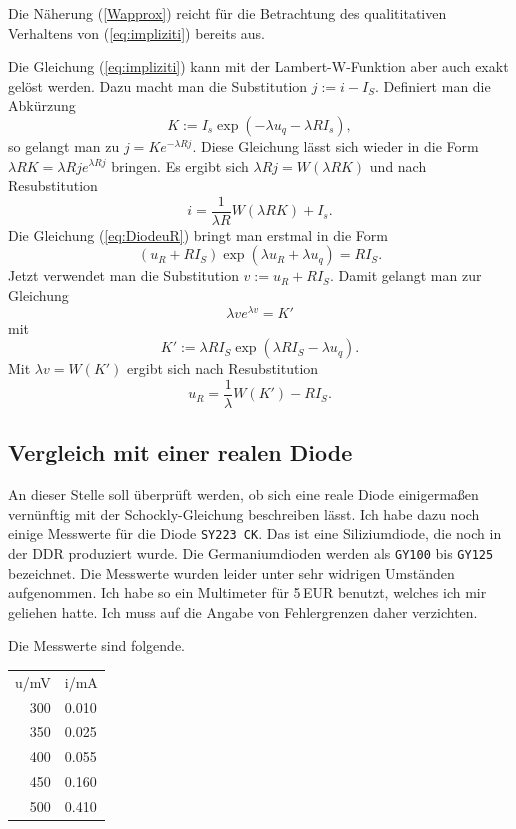 \documentclass[a4paper,10pt,fleqn,twocolumn,twoside]{article}
\numberwithin{equation}{section}
\begin{document}
Die Näherung (\ref{Wapprox}) reicht für die Betrachtung des
qualititativen Verhaltens von (\ref{eq:impliziti}) bereits aus.

Die Gleichung (\ref{eq:impliziti}) kann mit der Lambert-W-Funktion
aber auch exakt gelöst werden. Dazu macht man die Substitution
$j:=i-I_S$. Definiert man die Abkürzung
\begin{equation}
K:=I_s\exp(-\lambda u_q-\lambda RI_s),
\end{equation}
so gelangt man zu $j=Ke^{-\lambda Rj}$. Diese Gleichung lässt sich
wieder in die Form $\lambda RK=\lambda Rje^{\lambda Rj}$
bringen. Es ergibt sich $\lambda Rj=W(\lambda RK)$ und
nach Resubstitution
\begin{equation}
i = \frac{1}{\lambda R}W(\lambda RK)+I_s.
\end{equation}
Die Gleichung (\ref{eq:DiodeuR}) bringt man erstmal in die
Form
\begin{equation}
(u_R+RI_S)\exp(\lambda u_R+\lambda u_q) = RI_S.
\end{equation}
Jetzt verwendet man die Substitution
$v:=u_R+RI_S$. Damit gelangt man zur Gleichung
\begin{equation}
\lambda ve^{\lambda v}=K'
\end{equation}
mit
\begin{equation}
K':=\lambda RI_S\exp(\lambda RI_S-\lambda u_q).
\end{equation}
Mit $\lambda v=W(K')$ ergibt sich nach Resubstitution
\begin{equation}
u_R = \frac{1}{\lambda} W(K')-RI_S.
\end{equation}

\subsection{Vergleich mit einer realen Diode}
An dieser Stelle soll überprüft werden, ob sich eine
reale Diode einigermaßen vernünftig mit der Schockly-Gleichung
beschreiben lässt. Ich habe dazu noch einige Messwerte für
die Diode \texttt{SY223 CK}. Das ist eine Siliziumdiode, die noch
in der DDR produziert wurde. Die Germaniumdioden werden als
\texttt{GY100} bis \texttt{GY125} bezeichnet. Die Messwerte wurden
leider unter sehr widrigen Umständen aufgenommen. Ich habe so ein
Multimeter für 5\,EUR benutzt, welches ich mir geliehen hatte.
Ich muss auf die Angabe von Fehlergrenzen daher verzichten.

Die Messwerte sind folgende.

\begin{tt}
\begin{tabular}{r|l}
u/mV & i/mA\\
300 & 0.010\\
350 & 0.025\\
400 & 0.055\\
450 & 0.160\\
500 & 0.410
\end{tabular}
\end{tt}
\end{document}
